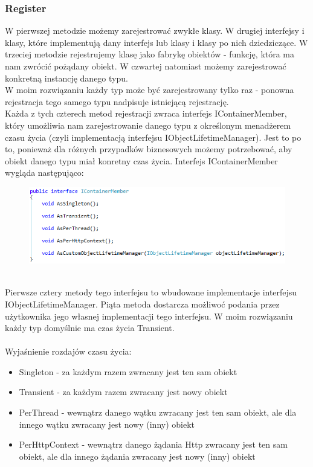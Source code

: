 \documentclass[12pt]{article}
\begin{document}
\clearpage
\subsubsection{Register}
W pierwszej metodzie możemy zarejestrować zwykłe klasy. W drugiej interfejsy i klasy, które implementują dany interfejs lub klasy i klasy po nich dziedziczące. W trzeciej metodzie rejestrujemy klasę jako fabrykę obiektów - funkcję, która ma nam zwrócić pożądany obiekt. W czwartej natomiast możemy zarejestrować konkretną instancję danego typu.\\
W moim rozwiązaniu każdy typ może być zarejestrowany tylko raz - ponowna rejestracja tego samego typu nadpisuje istniejącą rejestrację.\\
Każda z tych czterech metod rejestracji zwraca interfejs IContainerMember, który umożliwia nam zarejestrowanie danego typu z określonym menadżerem czasu życia (czyli implementacją interfejsu IObjectLifetimeManager). Jest to po to, ponieważ dla różnych przypadków biznesowych możemy potrzebować, aby obiekt danego typu miał konretny czas życia. Interfejs IContainerMember wygląda następująco:
\begin{figure}[h]
	\begin{raggedleft}
  		\includegraphics{IContainerMember.png}
	\end{raggedleft}
\end{figure}\\
Pierwsze cztery metody tego interfejsu to wbudowane implementacje interfejsu IObjectLifetimeManager. Piąta metoda dostarcza możliwoć podania przez użytkownika jego własnej implementacji tego interfejsu. W moim rozwiązaniu każdy typ domyślnie ma czas życia Transient.\\
\\
Wyjaśnienie rozdajów czasu życia:
\begin{itemize}
	\item Singleton - za każdym razem zwracany jest ten sam obiekt
	\item Transient - za każdym razem zwracany jest nowy obiekt
	\item PerThread - wewnątrz danego wątku zwracany jest ten sam obiekt, ale dla innego wątku zwracany jest nowy (inny) obiekt
	\item PerHttpContext - wewnątrz danego żądania Http zwracany jest ten sam obiekt, ale dla innego żądania zwracany jest nowy (inny) obiekt
\end{itemize}
\end{document}
